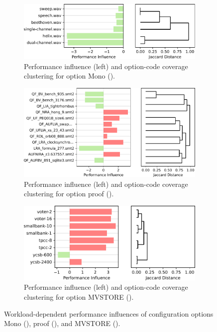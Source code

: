 {{{}

\begin{figure}

	\begin{subfigure}{\linewidth}
		\includegraphics[width=0.999\linewidth]{rq23/Mono.pdf}
		\caption{Performance influence (left) and option-code coverage clustering for option \textsf{Mono} (\jumper).}
		\label{fig:mono_jump3r}
	\end{subfigure}
	
	\begin{subfigure}{\linewidth}
		\vspace{2em}
		\includegraphics[width=0.999\linewidth]{rq23/proof.pdf}
		\caption{Performance influence (left) and option-code coverage clustering for option \textsf{proof} (\zdrei).}
		\label{fig:proof_z3}
	\end{subfigure}

	\begin{subfigure}{\linewidth}
		\vspace{2em}
		\includegraphics[width=0.999\linewidth]{rq23/MVSTORE.pdf}
		\caption{Performance influence (left) and option-code coverage clustering for option \textsf{MVSTORE} (\htwo).}
		\label{fig:mvstore_h2}
	\end{subfigure}
\caption{\color{blue} Workload-dependent performance influences of configuration options \textsf{Mono} (\jumper), \textsf{proof} (\zdrei), and \textsf{MVSTORE} (\htwo).}
\end{figure}

}}
